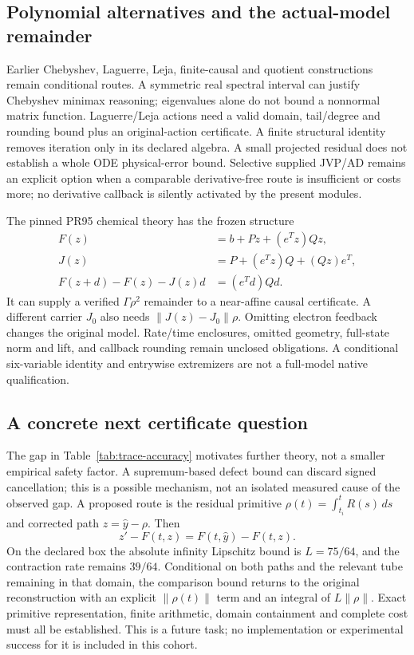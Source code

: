 \documentclass[aps,pra,reprint,onecolumn,10pt,notitlepage,nofootinbib]{revtex4-2}
\begin{document}
\subsection{Polynomial alternatives and the actual-model remainder}

Earlier Chebyshev, Laguerre, Leja, finite-causal and quotient constructions
remain conditional routes. A symmetric real spectral interval can justify
Chebyshev minimax reasoning; eigenvalues alone do not bound a nonnormal
matrix function. Laguerre/Leja actions need a valid domain, tail/degree and
rounding bound plus an original-action certificate. A finite structural
identity removes iteration only in its declared algebra. A small projected
residual does not establish a whole ODE physical-error bound.
Selective supplied JVP/AD remains an explicit option when a comparable
derivative-free route is insufficient or costs more; no derivative callback
is silently activated by the present modules.

The pinned PR95 chemical theory has the frozen structure
\begin{align}
F(z)&=b+Pz+(e^Tz)Qz,\\
J(z)&=P+(e^Tz)Q+(Qz)e^T,\\
F(z+d)-F(z)-J(z)d&=(e^Td)Qd.
\end{align}
It can supply a verified $\Gamma\rho^2$ remainder to a near-affine causal
certificate. A different carrier $J_0$ also needs
$\|J(z)-J_0\|\rho$. Omitting electron feedback changes the original model.
Rate/time enclosures, omitted geometry, full-state norm and lift, and callback
rounding remain unclosed obligations. A conditional six-variable identity and
entrywise extremizers are not a full-model native qualification.

\subsection{A concrete next certificate question}

The gap in Table~\ref{tab:trace-accuracy} motivates further theory, not a
smaller empirical safety factor. A supremum-based defect bound can discard
signed cancellation; this is a possible mechanism, not an isolated measured
cause of the observed gap. A proposed route is the residual primitive
$\rho(t)=\int_{t_i}^t R(s)\,ds$ and corrected path $z=\widehat y-\rho$.
Then
\begin{equation}
z'-F(t,z)=F(t,\widehat y)-F(t,z).
\end{equation}
On the declared box the absolute infinity Lipschitz bound is $L=75/64$,
and the contraction rate remains $39/64$. Conditional on both paths and the
relevant tube remaining in that domain, the comparison bound returns to the
original reconstruction with an explicit $\|\rho(t)\|$ term and an integral
of $L\|\rho\|$. Exact primitive representation, finite arithmetic, domain
containment and complete cost must all be established. This is a future task;
no implementation or experimental success for it is included in this cohort.
\end{document}
